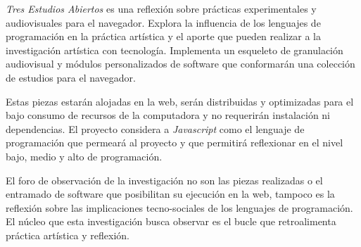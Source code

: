 
\textit{Tres Estudios Abiertos} es una reflexión sobre prácticas experimentales y audiovisuales para el navegador. Explora la influencia de los lenguajes de programación en la práctica artística y el aporte que pueden realizar a la investigación artística con tecnología. Implementa un esqueleto de granulación audiovisual y módulos personalizados de software que conformarán una colección de estudios para el navegador. 


Estas piezas estarán alojadas en la web, serán distribuidas y optimizadas para el bajo consumo de recursos de la computadora y no requerirán instalación ni dependencias. El proyecto considera a \textit{Javascript} como el lenguaje de programación que permeará al proyecto y que permitirá reflexionar en el nivel bajo, medio y alto de programación. %

El foro de observación de la investigación no son las piezas realizadas o el entramado de software que posibilitan su ejecución en la web, tampoco es la reflexión sobre las implicaciones tecno-sociales de los lenguajes de programación. El núcleo que esta investigación busca observar es el bucle que retroalimenta práctica artística y reflexión. %
